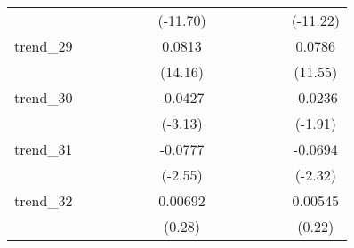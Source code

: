 {\begin{tabular}{l*{12}{c}}
            &                     &                     &                     &                     &                     &    (-11.70)         &                     &                     &                     &                     &                     &    (-11.22)         \\
[1em]
trend\_29    &                     &                     &                     &                     &                     &      0.0813\sym{***}&                     &                     &                     &                     &                     &      0.0786\sym{***}\\
            &                     &                     &                     &                     &                     &     (14.16)         &                     &                     &                     &                     &                     &     (11.55)         \\
[1em]
trend\_30    &                     &                     &                     &                     &                     &     -0.0427\sym{**} &                     &                     &                     &                     &                     &     -0.0236         \\
            &                     &                     &                     &                     &                     &     (-3.13)         &                     &                     &                     &                     &                     &     (-1.91)         \\
[1em]
trend\_31    &                     &                     &                     &                     &                     &     -0.0777\sym{*}  &                     &                     &                     &                     &                     &     -0.0694\sym{*}  \\
            &                     &                     &                     &                     &                     &     (-2.55)         &                     &                     &                     &                     &                     &     (-2.32)         \\
[1em]
trend\_32    &                     &                     &                     &                     &                     &     0.00692         &                     &                     &                     &                     &                     &     0.00545         \\
            &                     &                     &                     &                     &                     &      (0.28)         &                     &                     &                     &                     &                     &      (0.22)         \\

\end{tabular}}
